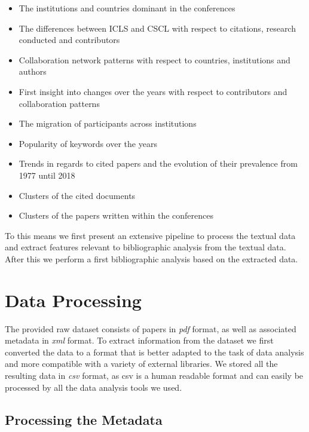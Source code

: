 \documentclass[article,twocolumn]{IEEEtran}
\providecommand{\tightlist}{%
      \setlength{\itemsep}{0pt}\setlength{\parskip}{0pt}}
\begin{document}
\begin{itemize}
\tightlist
\item
  The institutions and countries dominant in the conferences
\item
  The differences between ICLS and CSCL with respect to citations,
  research conducted and contributors
\item
  Collaboration network patterns with respect to countries, institutions
  and authors
\item
  First insight into changes over the years with respect to contributors
  and collaboration patterns
\item
  The migration of participants across institutions
\item
  Popularity of keywords over the years
\item
  Trends in regards to cited papers and the evolution of their
  prevalence from 1977 until 2018
\item
  Clusters of the cited documents
\item
  Clusters of the papers written within the conferences
\end{itemize}

To this means we first present an extensive pipeline to process the
textual data and extract features relevant to bibliographic analysis
from the textual data. After this we perform a first bibliographic
analysis based on the extracted data.

    \hypertarget{data-processing}{%
\section{Data Processing}\label{data-processing}}

    The provided raw dataset consists of papers in \emph{pdf} format, as
well as associated metadata in \emph{xml} format. To extract information
from the dataset we first converted the data to a format that is better
adapted to the task of data analysis and more compatible with a variety
of external libraries. We stored all the resulting data in \emph{csv}
format, as csv is a human readable format and can easily be processed by
all the data analysis tools we used.

    \hypertarget{processing-the-metadata}{%
\subsection{Processing the Metadata}\label{processing-the-metadata}}
\end{document}
